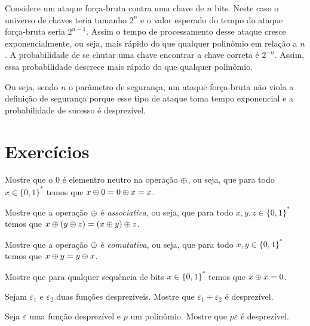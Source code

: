 \begin{example}
  Considere um ataque força-bruta contra uma chave de $n$ bits.
  Neste caso o universo de chaves teria tamanho $2^n$ e o valor esperado do tempo do ataque força-bruta seria $2^{n-1}$.
  Assim o tempo de processamento desse ataque cresce exponencialmente, ou seja, mais rápido do que qualquer polinômio em relação a $n$.
  A probabilidade de se chutar uma chave encontrar a chave correta é $2^{-n}$.
  Assim, essa probabilidade descrece mais rápido do que qualquer polinômio.

  Ou seja, sendo $n$ o parâmetro de segurança, um ataque força-bruta não viola a definição de segurança porque esse tipo de ataque toma tempo exponencial e a probabilidade de sucesso é desprezível.
\end{example}


\section{Exercícios}
\label{sec:exercicios}

\begin{exercicio}
  Mostre que o $0$ é elementro neutro na operação $\oplus$, ou seja, que para todo $x \in \{0,1\}^*$ temos que $x \oplus 0 = 0 \oplus x = x$.
\end{exercicio}

\begin{exercicio}
  Mostre que a operação $\oplus$ é {\em associativa}, ou seja, que para todo $x,y,z \in \{0,1\}^*$ temos que $x \oplus (y \oplus z) = (x \oplus y) \oplus z$.
\end{exercicio}

\begin{exercicio}
  Mostre que a operação $\oplus$ é {\em comutativa}, ou seja, que para todo $x,y \in \{0,1\}^*$ temos que $x \oplus y = y \oplus x$.
\end{exercicio}

\begin{exercicio}
  Mostre que para qualquer sequência de bits $x \in \{0,1\}^*$ temos que $x \oplus x = 0$.
\end{exercicio}

\begin{exercicio}
  Sejam $\varepsilon_1$ e $\varepsilon_2$ duas funções desprezíveis.
  Mostre que $\varepsilon_1 + \varepsilon_2$ é desprezível.
\end{exercicio}

\begin{exercicio}
  Seja $\varepsilon$ uma função desprezível e $p$ um polinômio.
  Mostre que $p\varepsilon$ é desprezível.
\end{exercicio}

